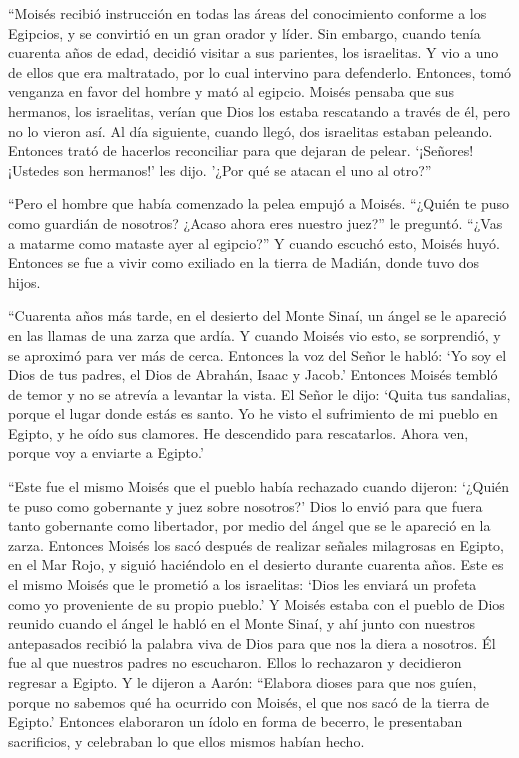 ``Moisés recibió instrucción en todas las áreas del
conocimiento conforme a los Egipcios, y se convirtió en un gran orador y
líder.  Sin embargo, cuando tenía cuarenta años de edad,
decidió visitar a sus parientes, los israelitas.  Y vio a
uno de ellos que era maltratado, por lo cual intervino para defenderlo.
Entonces, tomó venganza en favor del hombre y mató al egipcio.
 Moisés pensaba que sus hermanos, los israelitas, verían
que Dios los estaba rescatando a través de él, pero no lo vieron así.
 Al día siguiente, cuando llegó, dos israelitas estaban
peleando. Entonces trató de hacerlos reconciliar para que dejaran de
pelear. `¡Señores! ¡Ustedes son hermanos!' les dijo. '¿Por qué se atacan
el uno al otro?''

 ``Pero el hombre que había comenzado la pelea empujó a
Moisés. ``¿Quién te puso como guardián de nosotros? ¿Acaso ahora eres
nuestro juez?'' le preguntó.  ``¿Vas a matarme como mataste
ayer al egipcio?''  Y cuando escuchó esto, Moisés huyó.
Entonces se fue a vivir como exiliado en la tierra de Madián, donde tuvo
dos hijos.

 ``Cuarenta años más tarde, en el desierto del Monte Sinaí,
un ángel se le apareció en las llamas de una zarza que ardía.
 Y cuando Moisés vio esto, se sorprendió, y se aproximó
para ver más de cerca. Entonces la voz del Señor le habló: 
`Yo soy el Dios de tus padres, el Dios de Abrahán, Isaac y Jacob.'
Entonces Moisés tembló de temor y no se atrevía a levantar la vista.
 El Señor le dijo: `Quita tus sandalias, porque el lugar
donde estás es santo.  Yo he visto el sufrimiento de mi
pueblo en Egipto, y he oído sus clamores. He descendido para
rescatarlos. Ahora ven, porque voy a enviarte a Egipto.'

 ``Este fue el mismo Moisés que el pueblo había rechazado
cuando dijeron: `¿Quién te puso como gobernante y juez sobre nosotros?'
Dios lo envió para que fuera tanto gobernante como libertador, por medio
del ángel que se le apareció en la zarza.  Entonces Moisés
los sacó después de realizar señales milagrosas en Egipto, en el Mar
Rojo, y siguió haciéndolo en el desierto durante cuarenta años.
 Este es el mismo Moisés que le prometió a los israelitas:
`Dios les enviará un profeta como yo proveniente de su propio pueblo.'
 Y Moisés estaba con el pueblo de Dios reunido cuando el
ángel le habló en el Monte Sinaí, y ahí junto con nuestros antepasados
recibió la palabra viva de Dios para que nos la diera a nosotros.
 Él fue al que nuestros padres no escucharon. Ellos lo
rechazaron y decidieron regresar a Egipto.  Y le dijeron a
Aarón: ``Elabora dioses para que nos guíen, porque no sabemos qué ha
ocurrido con Moisés, el que nos sacó de la tierra de Egipto.'
 Entonces elaboraron un ídolo en forma de becerro, le
presentaban sacrificios, y celebraban lo que ellos mismos habían hecho.

